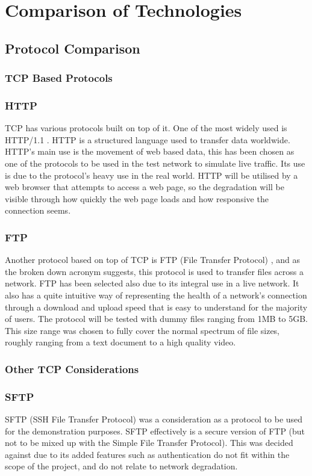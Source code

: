 \section{Comparison of Technologies}
\subsection{Protocol Comparison}
\subsubsection{TCP Based Protocols}

\subsubsection*{HTTP}
TCP has various protocols built on top of it. One of the most widely used is HTTP/1.1 \citep{HTTP}. HTTP is a structured language used to transfer data worldwide. HTTP's main use is the movement of web based data, this has been chosen as one of the protocols to be used in the test network to simulate live traffic. Its use is due to the protocol's heavy use in the real world. HTTP will be utilised by a web browser that attempts to access a web page, so the degradation will be visible through how quickly the web page loads and how responsive the connection seems.

\subsubsection*{FTP}
Another protocol based on top of TCP is FTP (File Transfer Protocol) \citep{FTP}, and as the broken down acronym suggests, this protocol is used to transfer files across a network. FTP has been selected also due to its integral use in a live network. It also has a quite intuitive way of representing the health of a network's connection through a download and upload speed that is easy to understand for the majority of users. The protocol will be tested with dummy files ranging from 1MB to 5GB. This size range was chosen to fully cover the normal spectrum of file sizes, roughly ranging from a text document to a high quality video.

\subsubsection*{Other TCP Considerations}
\label{ref:otherTCP}

\subsubsection*{SFTP}
SFTP (SSH File Transfer Protocol) \citep{SFTP} was a consideration as a protocol to be used for the demonstration purposes. SFTP effectively is a secure version of FTP (but not to be mixed up with the Simple File Transfer Protocol). This was decided against due to its added features such as authentication do	not fit within the scope of the project, and do not relate to network degradation. 


